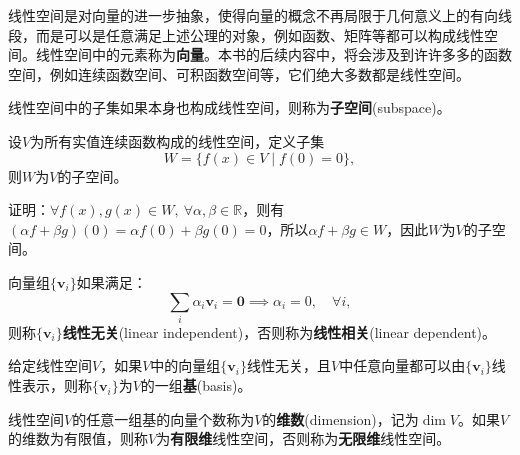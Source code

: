 线性空间是对向量的进一步抽象，使得向量的概念不再局限于几何意义上的有向线段，而是可以是任意满足上述公理的对象，例如函数、矩阵等都可以构成线性空间。线性空间中的元素称为\textbf{向量}。本书的后续内容中，将会涉及到许许多多的函数空间，例如连续函数空间、可积函数空间等，它们绝大多数都是线性空间。

\begin{definition}[子空间]
    线性空间中的子集如果本身也构成线性空间，则称为\textbf{子空间}(subspace)。
\end{definition}

\begin{example}
    设$V$为所有实值连续函数构成的线性空间，定义子集
    \begin{equation}
        W=\{f(x)\in V \mid f(0)=0\},
    \end{equation}
    则$W$为$V$的子空间。

    证明：$\forall f(x),g(x)\in W,\ \forall \alpha,\beta\in \mathbb{R}$，则有$(\alpha f+\beta g)(0)=\alpha f(0)+\beta g(0)=0$，所以$\alpha f+\beta g\in W$，因此$W$为$V$的子空间。
\end{example}

\begin{definition}[线性无关]
    向量组$\{\mathbf{v}_i\}$如果满足：
    \begin{equation}
        \sum_i \alpha_i \mathbf{v}_i=\mathbf{0}\implies \alpha_i=0,\quad \forall i,
    \end{equation}
    则称$\{\mathbf{v}_i\}$\textbf{线性无关}(linear independent)，否则称为\textbf{线性相关}(linear dependent)。
\end{definition}

\begin{definition}[基]
    给定线性空间$V$，如果$V$中的向量组$\{\mathbf{v}_i\}$线性无关，且$V$中任意向量都可以由$\{\mathbf{v}_i\}$线性表示，则称$\{\mathbf{v}_i\}$为$V$的一组\textbf{基}(basis)。
\end{definition}


\begin{definition}[维数]
    线性空间$V$的任意一组基的向量个数称为$V$的\textbf{维数}(dimension)，记为$\dim V$。如果$V$的维数为有限值，则称$V$为\textbf{有限维}线性空间，否则称为\textbf{无限维}线性空间。
\end{definition}


